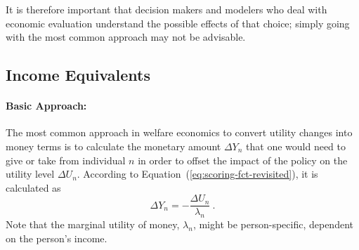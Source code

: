 %
It is therefore important that decision makers and modelers who deal with economic evaluation understand the possible effects of that choice; simply going with the most common approach may not be advisable.
%

\subsection{Income Equivalents}%
\label{ch:economicEval:aggregatingValues:income}%
%
\paragraph*{Basic Approach:}
%
The most common approach in welfare economics to convert utility changes into money terms is to calculate the monetary amount $\Delta Y_n$ that one would need to give or take from individual $n$ in order to offset the impact of the policy on the utility level $\Delta U_n$.
%
According to Equation~(\ref{eq:scoring-fct-revisited}), it is calculated as 
\begin{equation}
\Delta Y_n = - \frac{\Delta U_n}{\lambda_n} \ .
\label{eq:ch:economicEval:monetizationWtP}
\end{equation}
%
%
Note that the marginal utility of money, $\lambda_n$, might be person-specific, \eg dependent on the person's income.

